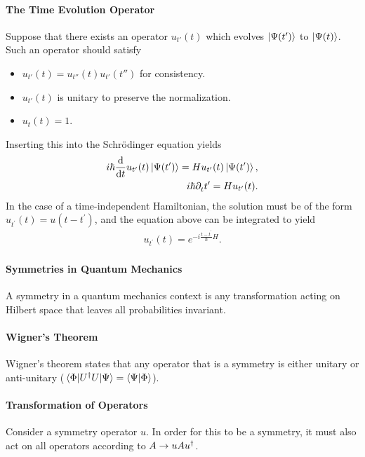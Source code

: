 \paragraph{The Time Evolution Operator}
Suppose that there exists an operator $u_{t'}(t)$ which evolves $\ket{\Psi(t')}$ to $\ket{\Psi(t)}$. Such an operator should satisfy
\begin{itemize}
	\item $u_{t'}(t) = u_{t''}(t)u_{t'}(t'')$ for consistency.
	\item $u_{t'}(t)$ is unitary to preserve the normalization.
	\item $u_{t}(t) = 1$.
\end{itemize}
Inserting this into the Schrödinger equation yields
\begin{align*}
	i\hbar\dv{t}u_{t^{\prime}}(t)\ket{\Psi(t^{\prime})} = Hu_{t^{\prime}}(t)\ket{\Psi(t^{\prime})}, \\
	i\hbar\partial_{t}^{}t^{\prime} = Hu_{t^{\prime}}(t).
\end{align*}
In the case of a time-independent Hamiltonian, the solution must be of the form $u_{t^{\prime}}(t) = u(t - t^{\prime})$, and the equation above can be integrated to yield
\begin{align*}
	u_{t^{\prime}}(t) = e^{-i\frac{t - t^{\prime}}{\hbar}H}.
\end{align*}

\paragraph{Symmetries in Quantum Mechanics}
A symmetry in a quantum mechanics context is any transformation acting on Hilbert space that leaves all probabilities invariant.

\paragraph{Wigner's Theorem}
Wigner's theorem states that any operator that is a symmetry is either unitary or anti-unitary ($\mel{\Phi}{U^{\dagger}U}{\Psi} = \braket{\Psi}{\Phi}$).

\paragraph{Transformation of Operators}
Consider a symmetry operator $u$. In order for this to be a symmetry, it must also act on all operators according to $A\to uAu^{\dagger}$.

